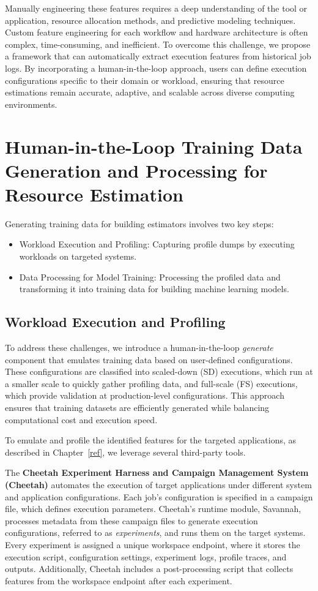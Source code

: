 Manually engineering these features requires a deep understanding of the tool or application, resource allocation methods, and predictive modeling techniques. Custom feature engineering for each workflow and hardware architecture is often complex, time-consuming, and inefficient. To overcome this challenge, we propose a framework that can automatically extract execution features from historical job logs. By incorporating a human-in-the-loop approach, users can define execution configurations specific to their domain or workload, ensuring that resource estimations remain accurate, adaptive, and scalable across diverse computing environments.

\section{Human-in-the-Loop Training Data Generation and Processing for Resource Estimation}

Generating training data for building estimators involves two key steps:  
\begin{itemize}
    \item Workload Execution and Profiling: Capturing profile dumps by executing workloads on targeted systems.  
    \item Data Processing for Model Training: Processing the profiled data and transforming it into training data for building machine learning models.  
\end{itemize}

\subsection{Workload Execution and Profiling}
To address these challenges, we introduce a human-in-the-loop \textit{generate} component that emulates training data based on user-defined configurations. These configurations are classified into scaled-down (SD) executions, which run at a smaller scale to quickly gather profiling data, and full-scale (FS) executions, which provide validation at production-level configurations. This approach ensures that training datasets are efficiently generated while balancing computational cost and execution speed.

To emulate and profile the identified features for the targeted applications, as described in Chapter~\ref{ref}, we leverage several third-party tools.

The \textbf{Cheetah Experiment Harness and Campaign Management System (Cheetah)} automates the execution of target applications under different system and application configurations. Each job's configuration is specified in a campaign file, which defines execution parameters. Cheetah’s runtime module, Savannah, processes metadata from these campaign files to generate execution configurations, referred to as \textit{experiments}, and runs them on the target systems. Every experiment is assigned a unique workspace endpoint, where it stores the execution script, configuration settings, experiment logs, profile traces, and outputs. Additionally, Cheetah includes a post-processing script that collects features from the workspace endpoint after each experiment.

